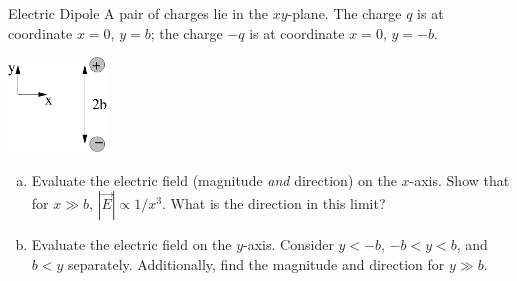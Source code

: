 \documentclass{esg8022pset}
\begin{document}
\begin{problem}{Electric Dipole}
  A pair of charges lie in the $xy$-plane.  The charge $q$ is at coordinate $x = 0$, $y = b$; the charge $-q$ is at coordinate $x = 0$, $y = -b$.
  \begin{center}\includegraphics[width=0.2\textwidth]{ps01_8}\end{center}
  \begin{enumerate}[(a)]
    \item Evaluate the electric field (magnitude \emph{and} direction) on the $x$-axis.  Show that for $x \gg b$, $|\vec E| \propto 1 / x^3$.  What is the direction in this limit?
    \item Evaluate the electric field on the $y$-axis.  Consider $y < -b$, $-b < y < b$, and $b < y$ separately.  Additionally, find the magnitude and direction for $y \gg b$.
  \end{enumerate}
\end{problem}
\end{document}
